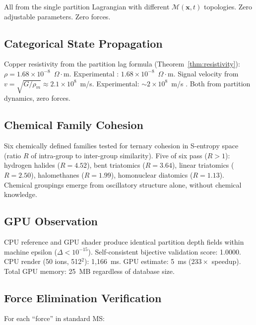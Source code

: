 \documentclass[11pt,twocolumn,a4paper]{article}
\theoremstyle{definition}
\theoremstyle{remark}
\newcommand{\Depth}{\mathcal{M}}
\begin{document}
All from the single partition Lagrangian with different $\Depth(\mathbf{x},t)$ topologies. Zero adjustable parameters. Zero forces.

\subsection{Categorical State Propagation}

Copper resistivity from the partition lag formula (Theorem~\ref{thm:resistivity}): $\rho = 1.68 \times 10^{-8}$~$\Omega\cdot$m. Experimental \citep{haynes2016}: $1.68 \times 10^{-8}$~$\Omega\cdot$m. Signal velocity from $v = \sqrt{G/\rho_m} \approx 2.1\times 10^8$~m/s. Experimental: $\sim 2\times 10^8$~m/s \citep{griffiths2017}. Both from partition dynamics, zero forces.

\subsection{Chemical Family Cohesion}

Six chemically defined families tested for ternary cohesion in S-entropy space (ratio $R$ of intra-group to inter-group similarity). Five of six pass ($R > 1$): hydrogen halides ($R = 4.52$), bent triatomics ($R = 3.64$), linear triatomics ($R = 2.50$), halomethanes ($R = 1.99$), homonuclear diatomics ($R = 1.13$). Chemical groupings emerge from oscillatory structure alone, without chemical knowledge.

\subsection{GPU Observation}

CPU reference and GPU shader produce identical partition depth fields within machine epsilon ($\Delta < 10^{-15}$). Self-consistent bijective validation score: 1.0000. CPU render (50 ions, 512$^2$): 1,166~ms. GPU estimate: 5~ms ($233\times$ speedup). Total GPU memory: 25~MB regardless of database size.

\subsection{Force Elimination Verification}

For each ``force'' in standard MS:
\end{document}
